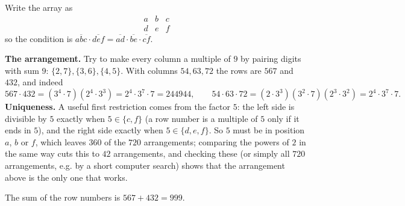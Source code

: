 Write the array as
\[
\begin{array}{ccc} a&b&c\\ d&e&f\end{array}
\]
so the condition is $\overline{abc}\cdot\overline{def}=\overline{ad}\cdot\overline{be}\cdot\overline{cf}$.

\textbf{The arrangement.} Try to make every column a multiple of $9$ by pairing digits with sum $9$: $\{2,7\},\{3,6\},\{4,5\}$. With columns $54,63,72$ the rows are $567$ and $432$, and indeed
\[
567\cdot432=(3^4\cdot7)(2^4\cdot3^3)=2^4\cdot3^7\cdot7=244944,\qquad 54\cdot63\cdot72=(2\cdot3^3)(3^2\cdot7)(2^3\cdot3^2)=2^4\cdot3^7\cdot7 .
\]
\textbf{Uniqueness.} A useful first restriction comes from the factor $5$: the left side is divisible by $5$ exactly when $5\in\{c,f\}$ (a row number is a multiple of $5$ only if it ends in $5$), and the right side exactly when $5\in\{d,e,f\}$. So $5$ must be in position $a$, $b$ or $f$, which leaves $360$ of the $720$ arrangements; comparing the powers of $2$ in the same way cuts this to $42$ arrangements, and checking these (or simply all $720$ arrangements, e.g. by a short computer search) shows that the arrangement above is the only one that works.

The sum of the row numbers is $567+432=\boxed{999}$.
